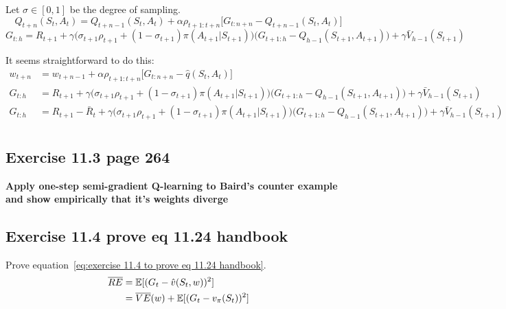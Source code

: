 Let $\sigma \in [0, 1]$ be the degree of sampling.
\begin{equation}
Q_{t+n}(S_t, A_t) = Q_{t+n-1}(S_t, A_t) + \alpha \rho_{t+1:t+n} \big[ G_{t:n+n} - Q_{t+n-1}(S_t, A_t) \big]
\tag{equation 7.11 handbook page 149}
\end{equation}
\begin{equation}
G_{t:h} = R_{t+1} + \gamma \Big( \sigma_{t+1}\rho_{t+1} + (1-\sigma_{t+1})\pi(A_{t+1}|S_{t+1}) \Big) \Big( G_{t+1:h} -Q_{h-1}(S_{t+1}, A_{t+1}) \Big) + \gamma \bar{V}_{h-1}(S_{t+1})
\tag{equation 7.17 handbook page 155, $Q(\sigma)$}
\end{equation}

It seems straightforward to do this:
\begin{equation}
\begin{split}
w_{t+n} & = w_{t+n-1} + \alpha \rho_{t+1:t+n}\big[ G_{t:n+n} - \hat{q}(S_t, A_t) \big]\\
G_{t:h} & = R_{t+1} + \gamma \Big( \sigma_{t+1}\rho_{t+1} + (1-\sigma_{t+1})\pi(A_{t+1}|S_{t+1}) \Big) \Big( G_{t+1:h} -Q_{h-1}(S_{t+1}, A_{t+1}) \Big) + \gamma \bar{V}_{h-1}(S_{t+1}) \\
G_{t:h} & = R_{t+1} -\bar{R}_t + \gamma \Big( \sigma_{t+1}\rho_{t+1} + (1-\sigma_{t+1})\pi(A_{t+1}|S_{t+1}) \Big) \Big( G_{t+1:h} -Q_{h-1}(S_{t+1}, A_{t+1}) \Big) + \gamma \bar{V}_{h-1}(S_{t+1}) \\
\end{split}
\end{equation}

\subsection{Exercise 11.3 page 264}
\textbf{Apply one-step semi-gradient Q-learning to Baird's counter example and show empirically that it's weights diverge}

\subsection{Exercise 11.4 prove eq 11.24 handbook}
Prove equation~\ref{eq:exercise 11.4 to prove eq 11.24 handbook}.
\begin{equation}
\begin{split}
\overline{RE} & = \operatorname{\mathbb{E}}[(G_t - \hat{v}(S_t, w))^2] \\
& = \overline{VE}(w) + \operatorname{\mathbb{E}}[(G_t-v_{\pi}(S_t))^2] \\
\end{split}
\label{eq:exercise 11.4 to prove eq 11.24 handbook}
\end{equation}

